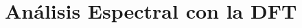 \documentclass{beamer}
\numberwithin{section}{part}
\begin{document}








\section{Análisis Espectral con la DFT}
\end{document}
